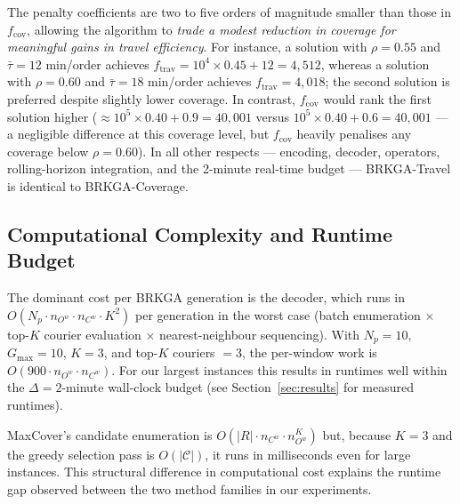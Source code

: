 The penalty coefficients are two to five orders of magnitude
smaller than those in $f_{\text{cov}}$, allowing the algorithm
to \emph{trade a modest reduction in coverage for meaningful
gains in travel efficiency}.
For instance, a solution with $\rho = 0.55$ and
$\bar{\tau} = 12$ min/order achieves
$f_{\text{trav}} = 10^4 \times 0.45 + 12 = 4{,}512$,
whereas a solution with $\rho = 0.60$ and
$\bar{\tau} = 18$ min/order achieves $f_{\text{trav}} = 4{,}018$;
the second solution is preferred despite slightly lower coverage.
In contrast, $f_{\text{cov}}$ would rank the first solution
higher ($\approx 10^5 \times 0.40 + 0.9 = 40{,}001$
versus $10^5 \times 0.40 + 0.6 = 40{,}001$
— a negligible difference at this coverage level, but
$f_{\text{cov}}$ heavily penalises any
coverage below $\rho = 0.60$).
In all other respects — encoding, decoder, operators,
rolling-horizon integration, and the 2-minute real-time budget —
BRKGA-Travel is identical to BRKGA-Coverage.

\subsection{Computational Complexity and Runtime Budget}
\label{subsec:complexity}

The dominant cost per BRKGA generation is the decoder, which
runs in $O(N_p \cdot n_{O^w} \cdot n_{C^w} \cdot K^2)$ per generation
in the worst case (batch enumeration $\times$ top-$K$ courier
evaluation $\times$ nearest-neighbour sequencing).
With $N_p = 10$, $G_{\max} = 10$, $K = 3$, and
top-$K$ couriers $= 3$, the per-window work is
$O(900 \cdot n_{O^w} \cdot n_{C^w})$.
For our largest instances this results in runtimes well within
the $\Delta = 2$-minute wall-clock budget (see
Section~\ref{sec:results} for measured runtimes).

MaxCover's candidate enumeration is
$O(|R| \cdot n_{C^w} \cdot n_{O^w}^K)$
but, because $K = 3$ and the greedy selection pass is $O(|\mathcal{C}|)$,
it runs in milliseconds even for large instances.
This structural difference in computational cost explains the
runtime gap observed between the two method families in our
experiments.
